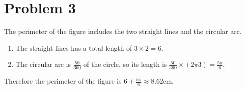 \section*{Problem 3}
The perimeter of the figure includes the two straight lines and the circular arc.

\begin{enumerate}
    \item{The straight lines has a total length of $ 3 \times 2 = 6 $. }
    \item{The circular arc is $ \frac{50}{360} $ of the circle, so its length is $ \frac{50}{360} \times (2 \pi 3) = \frac{5\pi}{6} $. }
\end{enumerate}

Therefore the perimeter of the figure is $ 6 + \frac{5\pi}{6} \approx 8.62 \text{cm}$.
